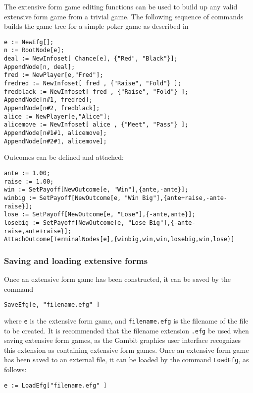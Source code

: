 The extensive form game editing functions can be used to build up any
valid extensive form game from a trivial game.  The following sequence
of commands builds the game tree for a simple poker game as described
in \cite{Mye:91}

\begin{verbatim}
e := NewEfg[];
n := RootNode[e];
deal := NewInfoset[ Chance[e], {"Red", "Black"}];
AppendNode[n, deal];
fred := NewPlayer[e,"Fred"];
fredred := NewInfoset[ fred , {"Raise", "Fold"} ];
fredblack := NewInfoset[ fred , {"Raise", "Fold"} ];
AppendNode[n#1, fredred];
AppendNode[n#2, fredblack];
alice := NewPlayer[e,"Alice"];
alicemove := NewInfoset[ alice , {"Meet", "Pass"} ];
AppendNode[n#1#1, alicemove]; 
AppendNode[n#2#1, alicemove]; 
\end{verbatim}

\noindent Outcomes can be defined and attached:

\begin{verbatim}
ante := 1.00;
raise := 1.00;
win := SetPayoff[NewOutcome[e, "Win"],{ante,-ante}];
winbig := SetPayoff[NewOutcome[e, "Win Big"],{ante+raise,-ante-raise}];
lose := SetPayoff[NewOutcome[e, "Lose"],{-ante,ante}];
losebig := SetPayoff[NewOutcome[e, "Lose Big"],{-ante-raise,ante+raise}];
AttachOutcome[TerminalNodes[e],{winbig,win,win,losebig,win,lose}]
\end{verbatim}

\subsubsection{Saving and loading extensive forms}

Once an extensive form game has been constructed, it can be saved by
the command 

\begin{verbatim}
SaveEfg[e, "filename.efg" ]
\end{verbatim}

\noindent where \verb+e+ is the extensive form game, and \verb+filename.efg+ is
the filename of the file to be created.  It is recommended that the
filename extension \verb+.efg+ be used when saving extensive form
games, as the Gambit graphics user interface recognizes this extension
as containing extensive form games.  Once an extensive form game has
been saved to an external file, it can be loaded by the command
\verb+LoadEfg+, as follows:

\begin{verbatim}
e := LoadEfg["filename.efg" ]
\end{verbatim}

